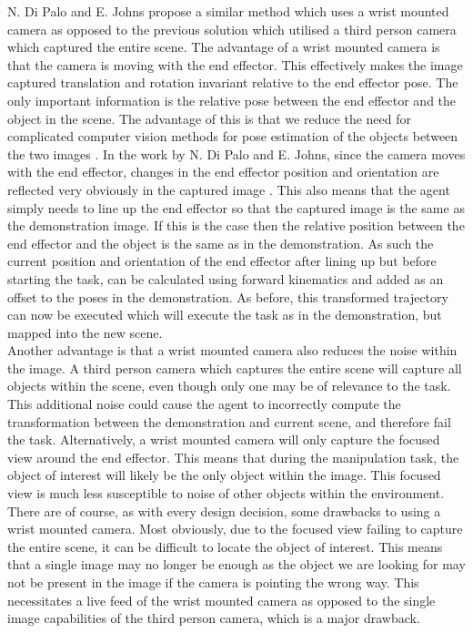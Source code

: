 N. Di Palo and E. Johns propose a similar method \cite{one-shot-imitation} which uses a wrist mounted camera as opposed to the previous solution which utilised a third person camera which captured the entire scene. The advantage of a wrist mounted camera is that the camera is moving with the end effector. This effectively makes the image captured translation and rotation invariant relative to the end effector pose. The only important information is the relative pose between the end effector and the object in the scene. The advantage of this is that we reduce the need for complicated computer vision methods for pose estimation of the objects between the two images \cite{one-shot-pose-estimate}. In the work by N. Di Palo and E. Johns, since the camera moves with the end effector, changes in the end effector position and orientation are reflected very obviously in the captured image \cite{one-shot-imitation}. This also means that the agent simply needs to line up the end effector so that the captured image is the same as the demonstration image. If this is the case then the relative position between the end effector and the object is the same as in the demonstration. As such the current position and orientation of the end effector after lining up but before starting the task, can be calculated using forward kinematics and added as an offset to the poses in the demonstration. As before, this transformed trajectory can now be executed which will execute the task as in the demonstration, but mapped into the new scene.\\

Another advantage is that a wrist mounted camera also reduces the noise within the image. A third person camera which captures the entire scene will capture all objects within the scene, even though only one may be of relevance to the task. This additional noise could cause the agent to incorrectly compute the transformation between the demonstration and current scene, and therefore fail the task. Alternatively, a wrist mounted camera will only capture the focused view around the end effector. This means that during the manipulation task, the object of interest will likely be the only object within the image. This focused view is much less susceptible to noise of other objects within the environment.\\

There are of course, as with every design decision, some drawbacks to using a wrist mounted camera. Most obviously, due to the focused view failing to capture the entire scene, it can be difficult to locate the object of interest. This means that a single image may no longer be enough as the object we are looking for may not be present in the image if the camera is pointing the wrong way. This necessitates a live feed of the wrist mounted camera as opposed to the single image capabilities of the third person camera, which is a major drawback.\\

